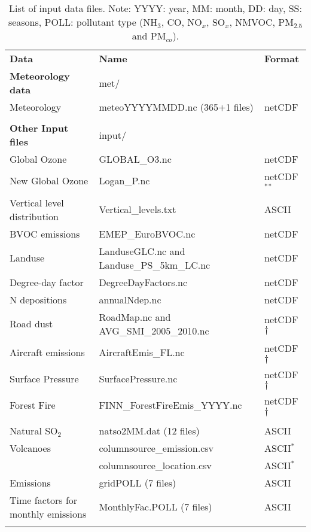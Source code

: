 \begin{table}
\caption[List of input data files]{List of input data files.
Note: YYYY: year, MM: month, DD: day, SS: seasons, POLL: pollutant
type (NH$_3$, CO, NO$_x$, SO$_x$, NMVOC,
PM$_{2.5}$ and PM$_{co}$). 
\label{Tab:inputdata}}
\begin{center}
\begin{small}
\begin{tabular}{lll}
\hline
{\bf Data} &  {\bf Name} & {\bf Format}\\
{\bf Meteorology data} & met/&  \\
Meteorology  &  meteoYYYYMMDD.nc \quad (365+1 files) & netCDF\\
& & \\
{\bf Other Input files} & input/ &\\
Global Ozone & GLOBAL\_O3.nc & netCDF\\
New Global Ozone & Logan\_P.nc & netCDF $^*$$^*$\\
Vertical level distribution & Vertical\_levels.txt & ASCII\\
BVOC emissions & EMEP\_EuroBVOC.nc & netCDF\\
Landuse & LanduseGLC.nc and Landuse\_PS\_5km\_LC.nc  & netCDF\\
Degree-day factor & DegreeDayFactors.nc &  netCDF\\
N depositions & annualNdep.nc  & netCDF\\
Road dust &  RoadMap.nc and AVG\_SMI\_2005\_2010.nc& netCDF$\dagger$ \\
Aircraft emissions & AircraftEmis\_FL.nc & netCDF$\dagger$ \\
Surface Pressure & SurfacePressure.nc & netCDF$\dagger$ \\
Forest Fire & FINN\_ForestFireEmis\_YYYY.nc & netCDF$\dagger$ \\
& & \\
Natural SO$_2$ & natso2MM.dat  \quad (12 files) & ASCII\\
Volcanoes & columnsource\_emission.csv & ASCII$^*$\\
	  & columnsource\_location.csv& ASCII$^*$ \\ 
Emissions & gridPOLL  \quad (7 files) & ASCII\\
Time factors for monthly emissions& MonthlyFac.POLL  \quad (7 files) & ASCII\\
$$
\end{tabular}
\end{small}
\end{center}
\end{table}
